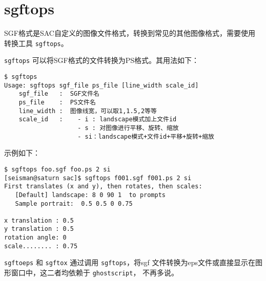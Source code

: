 \section{sgftops}
\label{sec:sgftops}
\label{sec:sgftoeps}
\label{sec:sgftox}

SGF格式是SAC自定义的图像文件格式，转换到常见的其他图像格式，需要使用
转换工具 \texttt{sgftops}。

\texttt{sgftops} 可以将SGF格式的文件转换为PS格式。其用法如下：
\begin{verbatim}
$ sgftops
Usage: sgftops sgf_file ps_file [line_width scale_id]
    sgf_file   :  SGF文件名
    ps_file    :  PS文件名
    line_width :  图像线宽，可以取1,1.5,2等等
    scale_id   :    - i : landscape模式加上文件id
                    - s : 对图像进行平移、旋转、缩放
                    - si：landscape模式+文件id+平移+旋转+缩放
\end{verbatim}

示例如下：
\begin{verbatim}
$ sgftops foo.sgf foo.ps 2 si
[seisman@saturn sac]$ sgftops f001.sgf f001.ps 2 si
First translates (x and y), then rotates, then scales:
   [Default] landscape: 8 0 90 1  to prompts
   Sample portrait:  0.5 0.5 0 0.75

x translation : 0.5
y translation : 0.5
rotation angle: 0
scale........ : 0.75
\end{verbatim}

\texttt{sgftoeps} 和 \texttt{sgftox} 通过调用 \texttt{sgftops}，将sgf
文件转换为eps文件或直接显示在图形窗口中，这二者均依赖于 \texttt{ghostscript}，
不再多说。
